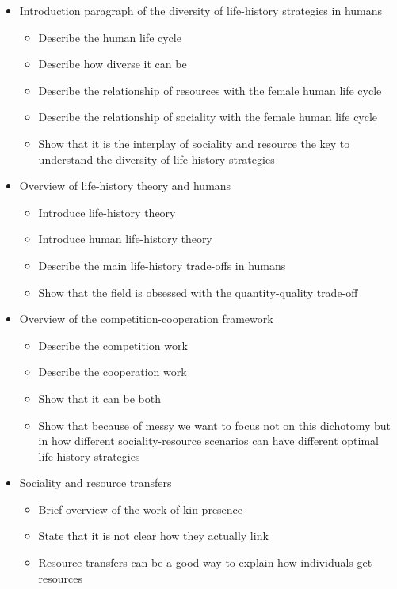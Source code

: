 \documentclass{article}
\begin{document}
\begin{itemize}
    \item Introduction paragraph of the diversity of life-history strategies in humans
    \begin{itemize}
        \item Describe the human life cycle
        \item Describe how diverse it can be
        \item Describe the relationship of resources with the female human life cycle
        \item Describe the relationship of sociality with the female human life cycle
        \item Show that it is the interplay of sociality and resource the key to understand the diversity of life-history strategies
    \end{itemize}
    \item Overview of life-history theory and humans
    \begin{itemize}
        \item Introduce life-history theory
        \item Introduce human life-history theory
        \item Describe the main life-history trade-offs in humans
        \item Show that the field is obsessed with the quantity-quality trade-off
    \end{itemize}
    \item Overview of the competition-cooperation framework
    \begin{itemize}
        \item Describe the competition work
        \item Describe the cooperation work
        \item Show that it can be both
        \item Show that because of messy we want to focus not on this dichotomy but in how different sociality-resource scenarios can have different optimal life-history strategies
    \end{itemize}
    \item Sociality and resource transfers
    \begin{itemize}
        \item Brief overview of the work of kin presence
        \item State that it is not clear how they actually link
        \item Resource transfers can be a good way to explain how individuals get resources

\end{itemize}
\end{itemize}
\end{document}
